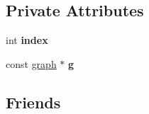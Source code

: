 \subsection*{Private Attributes}
\begin{DoxyCompactItemize}
\item 
\hypertarget{classnode__iterator_ad64c7e47ca2b4a9855950a5f5b7e467b}{int {\bfseries index}}\label{classnode__iterator_ad64c7e47ca2b4a9855950a5f5b7e467b}

\item 
\hypertarget{classnode__iterator_a3d0f6d4ef5877646a243ff597f0a78cf}{const \hyperlink{classgraph}{graph} $\ast$ {\bfseries g}}\label{classnode__iterator_a3d0f6d4ef5877646a243ff597f0a78cf}

\end{DoxyCompactItemize}
\subsection*{Friends}
